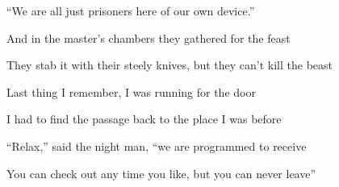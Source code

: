 ``We are all just prisoners here of our own device.''

And in the master's chambers
they gathered for the feast

They stab it with their steely knives,
but they can't kill the beast
\ks

\zs
Last thing I remember,
I was running for the door

I had to find the passage
back to the place I was before

``Relax,'' said the night man,
``we are programmed to receive

You can check out any time you like,
but you can never leave''
\ks

\kp
